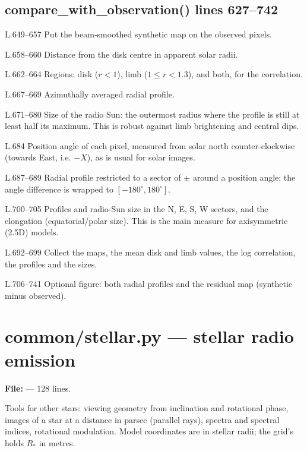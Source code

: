 \section*{\normalsize compare\_with\_observation() \hfill{\small\mdseries\color{gray}lines 627--742}}

\begin{lines}
\item[L.649–657] Put the beam-smoothed synthetic map on the observed pixels.
\item[L.658–660] Distance from the disk centre in apparent solar radii.
\item[L.662–664] Regions: disk ($r<1$), limb ($1\le r<1.3$), and both, for the correlation.
\item[L.667–669] Azimuthally averaged radial profile.
\item[L.671–680] Size of the radio Sun: the outermost radius where the profile is still at least half its maximum. This is robust against limb brightening and central dips.
\item[L.684] Position angle of each pixel, measured from solar north counter-clockwise (towards East, i.e. $-X$), as is usual for solar images.
\item[L.687–689] Radial profile restricted to a sector of $\pm$  around a position angle; the angle difference is wrapped to $[-180^\circ,180^\circ]$.
\item[L.700–705] Profiles and radio-Sun size in the N, E, S, W sectors, and the elongation (equatorial/polar size). This is the main measure for axisymmetric (2.5D) models.
\item[L.692–699] Collect the maps, the mean disk and limb values, the log correlation, the profiles and the sizes.
\item[L.706–741] Optional figure: both radial profiles and the residual map (synthetic minus observed).
\end{lines}

\chapter{common/stellar.py --- stellar radio emission}
\label{mod:common:stellar.py}
\textbf{File:}  --- 128 lines.

Tools for other stars: viewing geometry from inclination and rotational phase,
images of a star at a distance in parsec (parallel rays), spectra and spectral
indices, rotational modulation. Model coordinates are in stellar radii; the grid's
 holds $R_\ast$ in metres.

